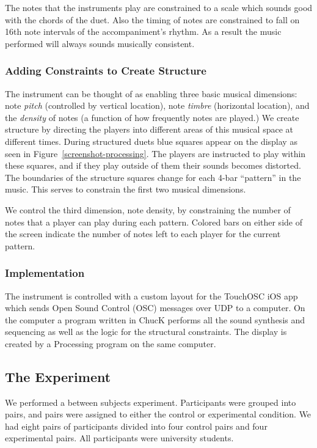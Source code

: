 \documentclass{article}
\begin{document}
The notes that the instruments play are constrained to a scale which sounds good with the chords of the duet.  Also the timing of notes are constrained to fall on 16th note intervals of the accompaniment's rhythm.  As a result the music performed will always sounds musically consistent.

\subsubsection{Adding Constraints to Create Structure}

The instrument can be thought of as enabling three basic musical dimensions: note \emph{pitch} (controlled by vertical location), note \emph{timbre} (horizontal location), and the \emph{density} of notes (a function of how frequently notes are played.)  We create structure by directing the players into different areas of this musical space at different times. During structured duets blue squares appear on the display as seen in Figure~\ref{screenshot-processing}.  The players are instructed to play within these squares, and if they play outside of them their sounds becomes distorted. The boundaries of the structure squares change for each 4-bar “pattern” in the music. This serves to constrain the first two musical dimensions.

We control the third dimension, note density, by constraining the number of notes that a player can play during each pattern. Colored bars on either side of the screen indicate the number of notes left to each player for the current pattern.


\subsubsection{Implementation}

The instrument is controlled with a custom layout for the TouchOSC iOS app which sends Open Sound Control (OSC) messages over UDP to a computer.  On the computer a program written in ChucK performs all the sound synthesis and sequencing as well as the logic for the structural constraints. The display is created by a Processing program on the same computer.



\subsection{The Experiment}
We performed a between subjects experiment.  Participants were grouped into pairs, and pairs were assigned to either the control or experimental condition.  We had eight pairs of participants divided into four control pairs and four experimental pairs. All participants were university students.
\end{document}

